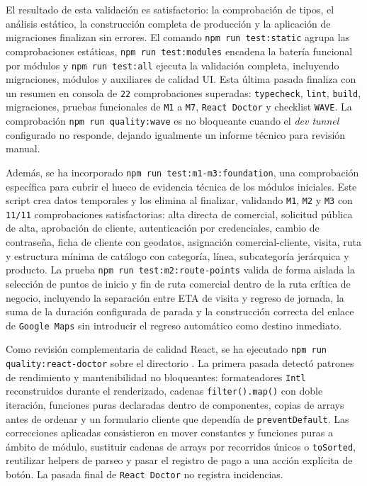 El resultado de esta validación es satisfactorio: la comprobación de tipos, el análisis estático, la construcción completa de producción y la aplicación de migraciones finalizan sin errores. El comando \texttt{npm run test:static} agrupa las comprobaciones estáticas, \texttt{npm run test:modules} encadena la batería funcional por módulos y \texttt{npm run test:all} ejecuta la validación completa, incluyendo migraciones, módulos y auxiliares de calidad UI. Esta última pasada finaliza con un resumen en consola de \texttt{22} comprobaciones superadas: \texttt{typecheck}, \texttt{lint}, \texttt{build}, migraciones, pruebas funcionales de \texttt{M1} a \texttt{M7}, \texttt{React Doctor} y checklist \texttt{WAVE}. La comprobación \texttt{npm run quality:wave} es no bloqueante cuando el \textit{dev tunnel} configurado no responde, dejando igualmente un informe técnico para revisión manual.

Además, se ha incorporado \texttt{npm run test:m1-m3:foundation}, una comprobación específica para cubrir el hueco de evidencia técnica de los módulos iniciales. Este script crea datos temporales y los elimina al finalizar, validando \texttt{M1}, \texttt{M2} y \texttt{M3} con \texttt{11/11} comprobaciones satisfactorias: alta directa de comercial, solicitud pública de alta, aprobación de cliente, autenticación por credenciales, cambio de contraseña, ficha de cliente con geodatos, asignación comercial-cliente, visita, ruta y estructura mínima de catálogo con categoría, línea, subcategoría jerárquica y producto. La prueba \texttt{npm run test:m2:route-points} valida de forma aislada la selección de puntos de inicio y fin de ruta comercial dentro de la ruta crítica de negocio, incluyendo la separación entre ETA de visita y regreso de jornada, la suma de la duración configurada de parada y la construcción correcta del enlace de \texttt{Google Maps} sin introducir el regreso automático como destino inmediato.

Como revisión complementaria de calidad React, se ha ejecutado \texttt{npm run quality:react-doctor} sobre el directorio . La primera pasada detectó patrones de rendimiento y mantenibilidad no bloqueantes: formateadores \texttt{Intl} reconstruidos durante el renderizado, cadenas \texttt{filter().map()} con doble iteración, funciones puras declaradas dentro de componentes, copias de arrays antes de ordenar y un formulario cliente que dependía de \texttt{preventDefault}. Las correcciones aplicadas consistieron en mover constantes y funciones puras a ámbito de módulo, sustituir cadenas de arrays por recorridos únicos o \texttt{toSorted}, reutilizar helpers de parseo y pasar el registro de pago a una acción explícita de botón. La pasada final de \texttt{React Doctor} no registra incidencias.

